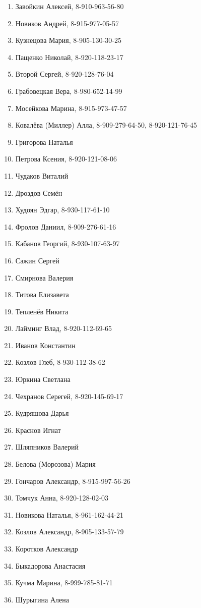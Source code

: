 \begin{enumerate}
\item Завойкин Алексей, 8-910-963-56-80
\item Новиков Андрей, 8-915-977-05-57
\item Кузнецова Мария, 8-905-130-30-25
\item Пащенко Николай, 8-920-118-23-17
\item Второй Сергей, 8-920-128-76-04
\item Грабовецкая Вера, 8-980-652-14-99
\item Мосейкова Марина, 8-915-973-47-57
\item Ковалёва (Миллер) Алла, 8-909-279-64-50, 8-920-121-76-45
\item Григорова Наталья
\item Петрова Ксения, 8-920-121-08-06
\item Чудаков Виталий
\item Дроздов Семён
\item Худоян Эдгар, 8-930-117-61-10
\item Фролов Даниил, 8-909-276-61-16
\item Кабанов Георгий, 8-930-107-63-97
\item Сажин Сергей
\item Смирнова Валерия
\item Титова Елизавета
\item Тепленёв Никита
\item Лайминг Влад, 8-920-112-69-65
\item Иванов Константин
\item Козлов Глеб, 8-930-112-38-62
\item Юркина Светлана
\item Чехранов Серегей, 8-920-145-69-17
\item Кудряшова Дарья
\item Краснов Игнат
\item Шляпников Валерий
\item Белова (Морозова) Мария
\item Гончаров Александр, 8-915-997-56-26
\item Томчук Анна, 8-920-128-02-03
\item Новикова Наталья, 8-961-162-44-21
\item Козлов Александр, 8-905-133-57-79
\item Коротков Александр
\item Быкадорова Анастасия
\item Кучма Марина, 8-999-785-81-71
\item Шурыгина Алена
\end{enumerate}
